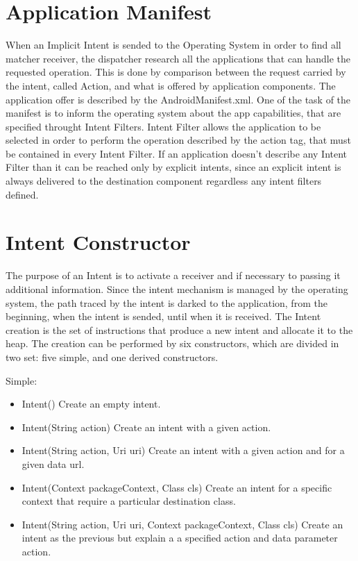 \section{Application Manifest}
When an Implicit Intent is sended to the Operating System in order to find all matcher receiver, the dispatcher research all the applications that can handle the requested operation. This is done by comparison between the request carried by the intent, called Action, and what is offered by application components. The application offer is described by the AndroidManifest.xml. One of the task of the manifest is to inform the operating system about the app capabilities, that are specified throught Intent Filters. Intent Filter allows the application to be selected in order to perform the operation described by the action tag, that must be contained in every Intent Filter. If an application doesn't describe any Intent Filter than it can be reached only by explicit intents, since an explicit intent is always delivered to the destination component regardless any intent filters defined.


\section{Intent Constructor}
The purpose of an Intent is to activate a receiver and if necessary to passing it additional information. Since the intent mechanism is managed by the operating system, the path traced by the intent is darked to the application, from the beginning, when the intent is sended, until when it is received.
The Intent creation is the set of instructions that produce a new intent and allocate it to the heap. The creation can be performed by six constructors, which are divided in two set: five simple, and one derived constructors.
\bigskip

\noindent 
Simple:
\begin{itemize}
	\item Intent() Create an empty intent. 
	\item Intent(String action) Create an intent with a given action.
	\item Intent(String action, Uri uri) Create an intent with a given action and for a given data url.
	\item Intent(Context packageContext, Class cls) Create an intent for a specific context that require a particular 	destination class.
	\item Intent(String action, Uri uri, Context packageContext, Class cls) Create an intent as the previous but explain a a specified action and data parameter action.
\end{itemize}

